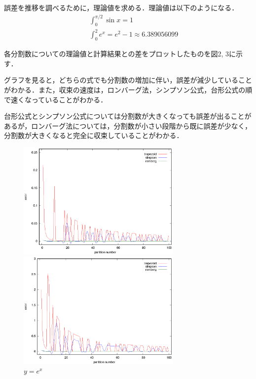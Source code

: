 \documentclass[titlepage,dvipdfmx]{jsarticle}
\begin{document}
誤差を推移を調べるために，理論値を求める．理論値は以下のようになる．
\begin{eqnarray}
&&\int_0^{\pi / 2}\sin x = 1 \nonumber\\
&&\int_0^2 e^x = e^2 - 1 \approx 6.389056099 \nonumber
\end{eqnarray}

各分割数についての理論値と計算結果との差をプロットしたものを図2, 3に示す．

グラフを見ると，どちらの式でも分割数の増加に伴い，誤差が減少していることがわかる．また，収束の速度は，ロンバーグ法，シンプソン公式，台形公式の順で速くなっていることがわかる．

台形公式とシンプソン公式については分割数が大きくなっても誤差が出ることがあるが，ロンバーグ法については，分割数が小さい段階から既に誤差が少なく，分割数が大きくなると完全に収束していることがわかる．

\begin{figure}[h]
\begin{minipage}{0.5\hsize}
	\centering
	\includegraphics[width=8cm]{sin.eps}
	\caption{$y = \sin x$}
	\label{fig:4-1}
\end{minipage}
\begin{minipage}{0.5\hsize}
	\centering
	\includegraphics[width=8cm]{e.eps}
	\caption{$y = e^x$}
	\label{fig:4-2}
\end{minipage}
\label{fig:5}
\end{figure}
\end{document}
